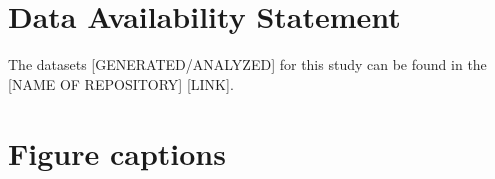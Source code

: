 \documentclass[utf8]{FrontiersinHarvard} %
\begin{document}
\section*{Data Availability Statement}
The datasets [GENERATED/ANALYZED] for this study can be found in the [NAME OF REPOSITORY] [LINK].





\section*{Figure captions}

\end{document}
